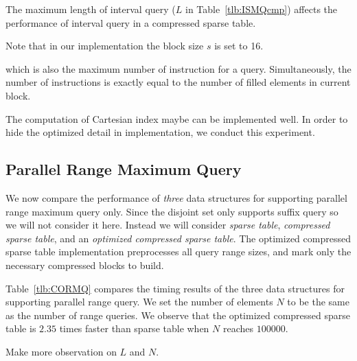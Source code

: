 
The maximum length of interval query ($L$ in Table~\ref{tlb:ISMQcmp})
affects the performance of interval query in a compressed sparse
table.

Note that in our implementation the block size $s$ is set to 16.

which is also the maximum number of instruction for a query.
Simultaneously, the number of instructions is exactly equal to the
number of filled elements in current block.


The computation of Cartesian index maybe can be implemented well.  In
order to hide the optimized detail in implementation, we conduct this
experiment.



\subsection{Parallel Range Maximum Query}

We now compare the performance of {\em three} data structures for
supporting parallel range maximum query only.  Since the disjoint set
only supports suffix query so we will not consider it here.  Instead
we will consider {\em sparse table}, {\em compressed sparse table},
and an {\em optimized compressed sparse table}.  The optimized
compressed sparse table implementation preprocesses all query range
sizes, and mark only the necessary compressed blocks to build.

Table~\ref{tlb:CORMQ} compares the timing results of the three data
structures for supporting parallel range query.  We set the number of
elements $N$ to be the same as the number of range queries.  We
observe that the optimized compressed sparse table is $2.35$ times
faster than sparse table when $N$ reaches $100000$.

Make more observation on $L$ and $N$.


